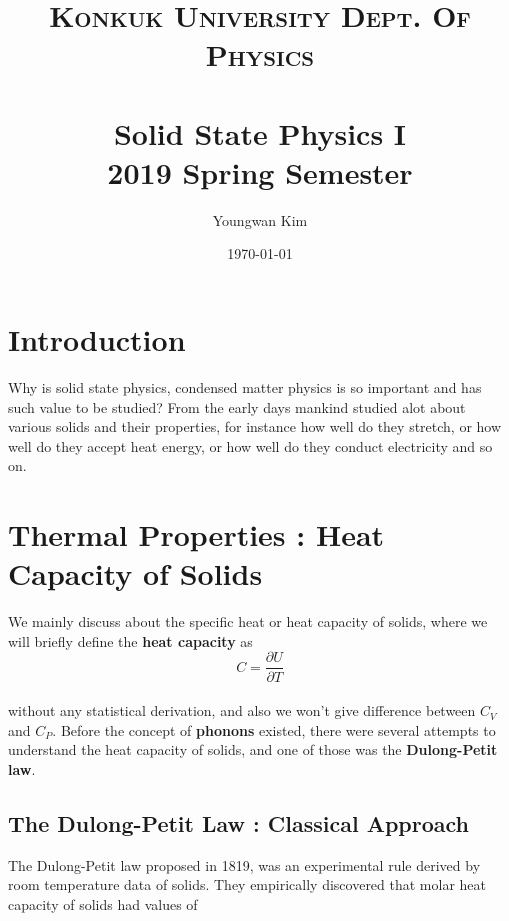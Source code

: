 \documentclass[paper=a4, fontsize=11pt]{scrartcl}
\title{	
	\normalfont \normalsize 
	\textsc{Konkuk University Dept. Of Physics} \\ [25pt] %
	\horrule{1pt} \\[0.4cm] 
	\huge Solid State Physics I \\
	\vspace{0.1in}
	\Large 2019 Spring Semester
	\horrule{1pt} \\[0.4cm] 
}
\author{Youngwan Kim}
\date{\normalsize\today}
\newcommand{\pder}[2]{\frac{\partial #1}{\partial #2}}
\begin{document}
	
\maketitle	

\vspace{0.25in}
\section{Introduction}
\vspace{0.25in}

Why is solid state physics, condensed matter physics is so important and has such value to be studied? From the early days mankind studied alot about various solids and their properties, for instance how well do they stretch, or how well do they accept heat energy, or how well do they conduct electricity and so on. 

\vspace{0.25in}
\section{Thermal Properties : Heat Capacity of Solids}
\vspace{0.25in}

We mainly discuss about the specific heat or heat capacity of solids, where we will briefly define the \textbf{heat capacity} as \\

\begin{equation}\nonumber
	C = \pder{U}{T}
\end{equation}\\

without any statistical derivation, and also we won't give difference between $C_V$ and $C_P$. Before the concept of \textbf{phonons} existed, there were several attempts to understand the heat capacity of solids, and one of those was the \textbf{Dulong-Petit law}.

\vspace{0.15in}
\subsection{The Dulong-Petit Law : Classical Approach}
\vspace{0.15in}

The Dulong-Petit law proposed in 1819, was an experimental rule derived by room temperature data of solids. They empirically discovered that molar heat capacity of solids had values of \\
\end{document}
